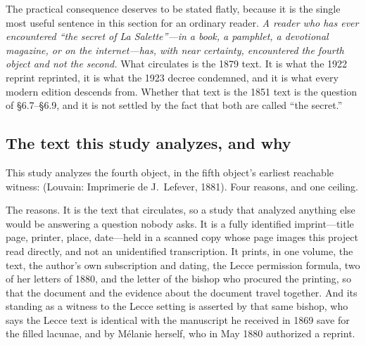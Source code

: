 The practical consequence deserves to be stated flatly, because it
is the single most useful sentence in this section for an ordinary
reader. \emph{A reader who has ever encountered ``the secret of La
Salette''---in a book, a pamphlet, a devotional magazine, or on the
internet---has, with near certainty, encountered the fourth object
and not the second.} What circulates is the 1879 text. It is what
the 1922 reprint reprinted, it is what the 1923 decree condemned,
and it is what every modern edition descends from. Whether that text
is the 1851 text is the question of \S6.7--\S6.9, and it is not
settled by the fact that both are called ``the secret.''

\subsection{The text this study analyzes, and why}

This study analyzes the fourth object, in the fifth object's
earliest reachable witness:  (Louvain:
Imprimerie de J.~Lefever, 1881). Four reasons, and one ceiling.

The reasons. It is the text that circulates, so a study that
analyzed anything else would be answering a question nobody asks. It
is a fully identified imprint---title page, printer, place,
date---held in a scanned copy whose page images this project read
directly, and not an unidentified transcription. It prints, in one
volume, the text, the author's own subscription and dating, the
Lecce permission formula, two of her letters of 1880, and the letter
of the bishop who procured the printing, so that the document and
the evidence about the document travel together. And its standing as
a witness to the Lecce setting is asserted by that same bishop, who
says the Lecce text is identical with the manuscript he received in
1869 save for the filled lacunae, and by Mélanie herself, who in May
1880 authorized a reprint.

